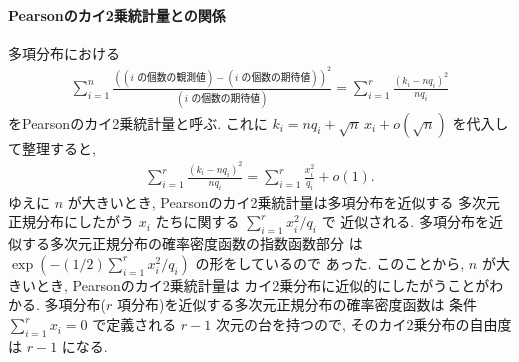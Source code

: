 \documentclass[12pt,twoside]{jarticle}
\theoremstyle{jplain}
\theoremstyle{jplain}
\theoremstyle{jplain}
\numberwithin{theorem}{section}
\numberwithin{equation}{section}
\numberwithin{figure}{section}
\numberwithin{table}{section}
\begin{document}
\paragraph{Pearsonのカイ2乗統計量との関係}
多項分布における
\begin{align*}
\sum_{i=1}^n
\frac
{((\text{$i$ の個数の観測値})-(\text{$i$ の個数の期待値}))^2}
{(\text{$i$ の個数の期待値})}
=\sum_{i=1}^r \frac{(k_i-nq_i)^2}{nq_i}
\end{align*}
をPearsonのカイ2乗統計量と呼ぶ.
これに $k_i=nq_i+\sqrt{n}\,x_i+o(\sqrt{n})$ を代入して整理すると,
\begin{align*}
\sum_{i=1}^r \frac{(k_i-nq_i)^2}{nq_i}
=\sum_{i=1}^r \frac{x_i^2}{q_i} + o(1).
\end{align*}
ゆえに $n$ が大きいとき, Pearsonのカイ2乗統計量は多項分布を近似する
多次元正規分布にしたがう $x_i$ たちに関する $\sum_{i=1}^r x_i^2/q_i$ で
近似される. 多項分布を近似する多次元正規分布の確率密度函数の指数函数部分
は $\exp\left(-(1/2)\sum_{i=1}^r x_i^2/q_i\right)$ の形をしているので
あった. このことから, $n$ が大きいとき, Pearsonのカイ2乗統計量は
カイ2乗分布に近似的にしたがうことがわかる.
多項分布($r$ 項分布)を近似する多次元正規分布の確率密度函数は
条件 $\sum_{i=1}^r x_i=0$ で定義される $r-1$ 次元の台を持つので,
そのカイ2乗分布の自由度は $r-1$ になる.
\end{document}
